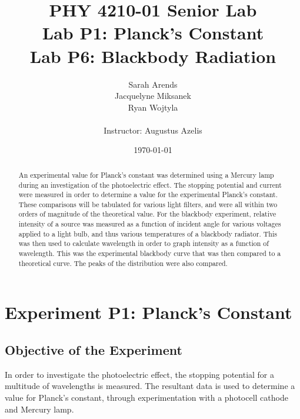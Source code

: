 \documentclass[a4paper]{article}
\title{PHY 4210-01 Senior Lab \\Lab P1: Planck's Constant\\Lab P6: Blackbody Radiation}
\author{Sarah Arends \\
        Jacquelyne Miksanek \\
        Ryan Wojtyla \\ \\
        Instructor: Augustus Azelis}
\date{\today}
\begin{document}
\maketitle

\begin{abstract}

\qq An experimental value for Planck's constant was determined using a Mercury lamp during an investigation of the photoelectric effect. The stopping potential
and current were measured in order to determine a value for the
experimental Planck's constant. These comparisons will be tabulated for various light filters, and were all within two orders of magnitude of the theoretical value. For the blackbody experiment, relative intensity of a source was measured as a function of incident angle for various voltages applied to a light bulb, and thus various temperatures of a blackbody radiator. This was then used to calculate wavelength in order to graph intensity as a function of wavelength. This was the
experimental blackbody curve that was then compared to a theoretical
curve. The peaks of the distribution were also compared.

\end{abstract}

\newpage

\tableofcontents

\newpage

\section{Experiment P1: Planck's Constant}

\subsection{Objective of the Experiment}
\qq In order to investigate the photoelectric effect, the stopping
potential for a multitude of wavelengths is measured. The resultant
data is used to determine a value for Planck's constant, through
experimentation with a photocell cathode and Mercury lamp.
\end{document}
